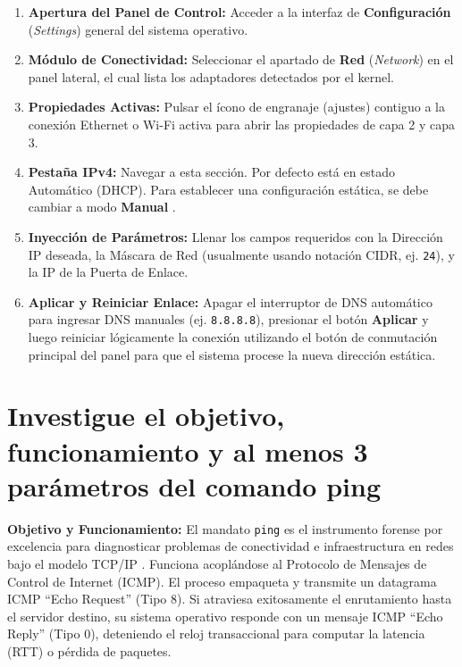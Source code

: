 \documentclass[a4paper,12pt]{article}
\begin{document}
\begin{enumerate}
    \item \textbf{Apertura del Panel de Control:} Acceder a la interfaz de \textbf{Configuración} (\textit{Settings}) general del sistema operativo.
    \item \textbf{Módulo de Conectividad:} Seleccionar el apartado de \textbf{Red} (\textit{Network}) en el panel lateral, el cual lista los adaptadores detectados por el kernel.
    \item \textbf{Propiedades Activas:} Pulsar el ícono de engranaje (ajustes) contiguo a la conexión Ethernet o Wi-Fi activa para abrir las propiedades de capa 2 y capa 3.
    \item \textbf{Pestaña IPv4:} Navegar a esta sección. Por defecto está en estado Automático (DHCP). Para establecer una configuración estática, se debe cambiar a modo \textbf{Manual} \cite{ref26}.
    \item \textbf{Inyección de Parámetros:} Llenar los campos requeridos con la Dirección IP deseada, la Máscara de Red (usualmente usando notación CIDR, ej. \texttt{24}), y la IP de la Puerta de Enlace.
    \item \textbf{Aplicar y Reiniciar Enlace:} Apagar el interruptor de DNS automático para ingresar DNS manuales (ej. \texttt{8.8.8.8}), presionar el botón \textbf{Aplicar} y luego reiniciar lógicamente la conexión utilizando el botón de conmutación principal del panel para que el sistema procese la nueva dirección estática.
\end{enumerate}

\section{Investigue el objetivo, funcionamiento y al menos 3 parámetros del comando ping}

\textbf{Objetivo y Funcionamiento:}
El mandato \texttt{ping} es el instrumento forense por excelencia para diagnosticar problemas de conectividad e infraestructura en redes bajo el modelo TCP/IP \cite{ref35}. Funciona acoplándose al Protocolo de Mensajes de Control de Internet (ICMP). El proceso empaqueta y transmite un datagrama ICMP ``Echo Request'' (Tipo 8). Si atraviesa exitosamente el enrutamiento hasta el servidor destino, su sistema operativo responde con un mensaje ICMP ``Echo Reply'' (Tipo 0), deteniendo el reloj transaccional para computar la latencia (RTT) o pérdida de paquetes.
\end{document}
